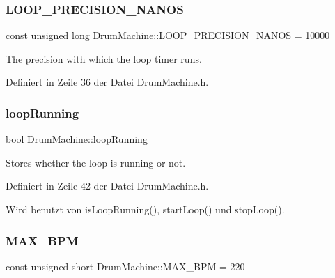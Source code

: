 \subsubsection{\texorpdfstring{L\+O\+O\+P\+\_\+\+P\+R\+E\+C\+I\+S\+I\+O\+N\+\_\+\+N\+A\+N\+OS}{LOOP\_PRECISION\_NANOS}}
{\footnotesize\ttfamily const unsigned long Drum\+Machine\+::\+L\+O\+O\+P\+\_\+\+P\+R\+E\+C\+I\+S\+I\+O\+N\+\_\+\+N\+A\+N\+OS = 10000\hspace{0.3cm}{\ttfamily [private]}}



The precision with which the loop timer runs. 



Definiert in Zeile 36 der Datei Drum\+Machine.\+h.

\mbox{\label{class_drum_machine_a4ac5a8c113e5a32a557f069e8d93cca8}} 
\subsubsection{\texorpdfstring{loop\+Running}{loopRunning}}
{\footnotesize\ttfamily bool Drum\+Machine\+::loop\+Running\hspace{0.3cm}{\ttfamily [private]}}



Stores whether the loop is running or not. 



Definiert in Zeile 42 der Datei Drum\+Machine.\+h.



Wird benutzt von is\+Loop\+Running(), start\+Loop() und stop\+Loop().

\mbox{\label{class_drum_machine_a0b64f2e265bb9fc06729090b7e05c005}} 
\subsubsection{\texorpdfstring{M\+A\+X\+\_\+\+B\+PM}{MAX\_BPM}}
{\footnotesize\ttfamily const unsigned short Drum\+Machine\+::\+M\+A\+X\+\_\+\+B\+PM = 220\hspace{0.3cm}{\ttfamily [private]}}



